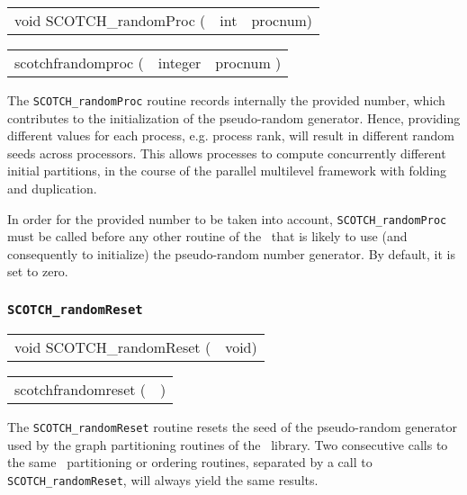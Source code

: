 \begin{itemize}
\progsyn

{\tt\begin{tabular}{l@{}ll}
void SCOTCH\_randomProc ( & int & procnum)
\end{tabular}}

{\tt\begin{tabular}{l@{}ll}
scotchfrandomproc ( & integer & procnum )
\end{tabular}}

\progdes

The {\tt SCOTCH\_randomProc} routine records internally the provided
number, which contributes to the initialization of the pseudo-random
generator. Hence, providing different values for each process,
e.g. process rank, will result in different random seeds across
processors. This allows processes to compute concurrently different
initial partitions, in the course of the parallel multilevel framework
with folding and duplication.

In order for the provided number to be taken into account,
{\tt SCOTCH\_\lbt random\lbt Proc} must be called before any other
routine of the \libscotch\ that is likely to use (and consequently
to initialize) the pseudo-random number generator. By default, it is
set to zero.
\end{itemize}

\subsubsection{{\tt SCOTCH\_randomReset}}

\begin{itemize}
\progsyn

{\tt\begin{tabular}{l@{}l}
void SCOTCH\_randomReset ( & void)
\end{tabular}}

{\tt\begin{tabular}{l@{}l}
scotchfrandomreset ( & )
\end{tabular}}

\progdes

The {\tt SCOTCH\_randomReset} routine resets the seed of the
pseudo-random generator used by the graph partitioning routines
of the \libscotch\ library. Two consecutive calls to
the same \libscotch\ partitioning or ordering routines, separated
by a call to {\tt SCOTCH\_\lbt random\lbt Reset}, will always yield
the same results.
\end{itemize}

